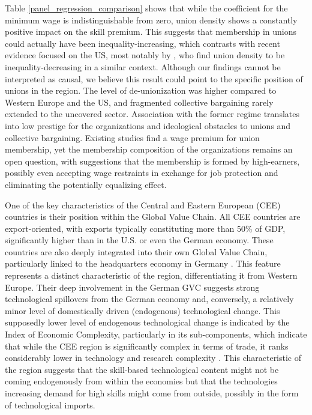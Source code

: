 \documentclass[11pt]{article}
\begin{document}
Table \ref{panel_regression_comparison} shows that while the coefficient for the minimum wage is indistinguishable from zero, union density shows a constantly positive impact on the skill premium. This suggests that membership in unions could actually have been inequality-increasing, which contrasts with recent evidence focused on the US, most notably by \citet{farber2021unions}, who find union density to be inequality-decreasing in a similar context. Although our findings cannot be interpreted as causal, we believe this result could point to the specific position of unions in the region. The level of de-unionization was higher compared to Western Europe and the US, and fragmented collective bargaining rarely extended to the uncovered sector. Association with the former regime translates into low prestige for the organizations and ideological obstacles to unions and collective bargaining. Existing studies find a wage premium for union membership, yet the membership composition of the organizations remains an open question, with suggestions that the membership is formed by high-earners, possibly even accepting wage restraints in exchange for job protection \citep{magda2017trade} and eliminating the potentially equalizing effect.

One of the key characteristics of the Central and Eastern European (CEE) countries is their position within the Global Value Chain. All CEE countries are export-oriented, with exports typically constituting more than 50\% of GDP, significantly higher than in the U.S. or even the German economy. These countries are also deeply integrated into their own Global Value Chain, particularly linked to the headquarters economy in Germany \citep{baldwin2015supply, stojkoski2023multidimensional}. This feature represents a distinct characteristic of the region, differentiating it from Western Europe. Their deep involvement in the German GVC suggests strong technological spillovers from the German economy and, conversely, a relatively minor level of domestically driven (endogenous) technological change. This supposedly lower level of endogenous technological change is indicated by the Index of Economic Complexity, particularly in its sub-components, which indicate that while the CEE region is significantly complex in terms of trade, it ranks considerably lower in technology and research complexity \citep{stojkoski2023multidimensional}. This characteristic of the region suggests that the skill-based technological content might not be coming endogenously from within the economies but that the technologies increasing demand for high skills might come from outside, possibly in the form of technological imports.
\end{document}
